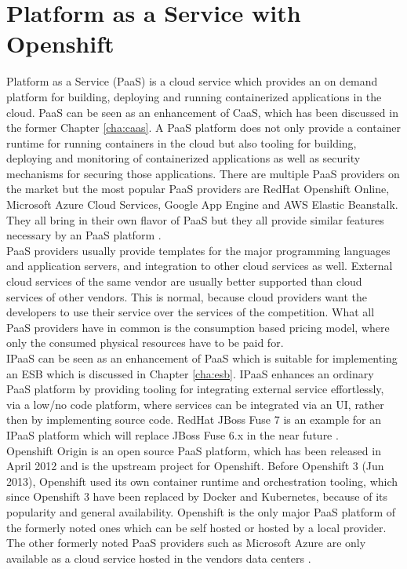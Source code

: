 \chapter{Platform as a Service with Openshift}
\label{cha:paas}
Platform as a Service (PaaS) is a cloud service which provides an on demand platform for building, deploying and running containerized applications in the cloud. PaaS can be seen as an enhancement of CaaS, which has been discussed in the former Chapter \vref{cha:caas}. A PaaS platform does not only provide a container runtime for running containers in the cloud but also tooling for building, deploying and monitoring of containerized applications as well as security mechanisms for securing those applications. There are multiple PaaS providers on the market but the most popular PaaS providers are RedHat Openshift Online, Microsoft Azure Cloud Services, Google App Engine and AWS Elastic Beanstalk. They all bring in their own flavor of PaaS but they all provide similar features necessary by an PaaS platform \cite{OpenshiftOnline2018, MicrosoftAzueCloudServices2018, GoogleCloudAE2018, AmazonWebServicesEBT2018}. \\

PaaS providers usually provide templates for the major programming languages and application servers, and integration to other cloud services as well. External cloud services of the same vendor are usually better supported than cloud services of other vendors. This is normal, because cloud providers want the developers to use their service over the services of the competition. What all PaaS providers have in common is the consumption based pricing model, where only the consumed physical resources have to be paid for. \\ 

IPaaS can be seen as an enhancement of PaaS which is suitable for implementing an ESB which is discussed in Chapter \vref{cha:esb}. IPaaS enhances an ordinary PaaS platform by providing tooling for integrating external service effortlessly, via a low/no code platform, where services can be integrated via an UI, rather then by implementing source code. RedHat JBoss Fuse 7 is an example for an IPaaS platform which will replace JBoss Fuse 6.x in the near future \cite{Fuse72018, iPaaSP12015, iPaaSP22015}. \\

Openshift Origin is an open source PaaS platform, which has been released in April 2012 and is the upstream project for Openshift. Before Openshift 3 (Jun 2013), Openshift used its own container runtime and orchestration tooling, which since Openshift 3 have been replaced by Docker and Kubernetes, because of its popularity and general availability. Openshift is the only major PaaS platform of the formerly noted ones which can be self hosted or hosted by a local provider. The other formerly noted PaaS providers such as Microsoft Azure are only available as a cloud service hosted in the vendors data centers \cite{OpenshiftOriginGithub2018}.

